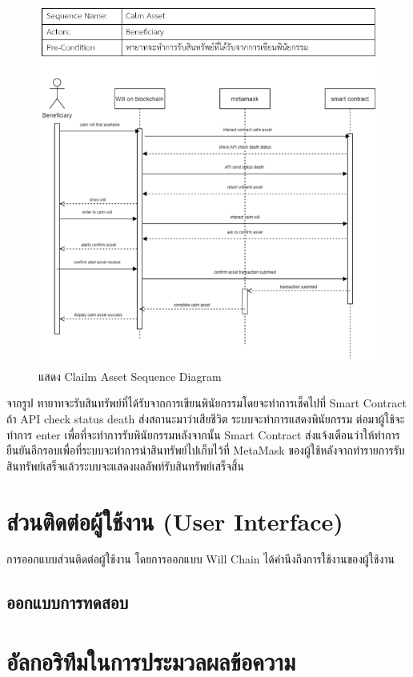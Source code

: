 \documentclass[12pt,oneside,openright,a4paper]{cpe-thai-project}
\begin{document}
\begin{enumerate}[label=\thesubsection.\arabic*,leftmargin=0pt,itemindent=2.5cm]
\begin{figure}[!thb]
			\includegraphics[scale=0.6]{calmAssetseq}
			\caption{แสดง Clailm Asset Sequence Diagram}
		\end{figure}
		\FloatBarrier
	\tab จากรูป ทายาทจะรับสินทรัพย์ที่ได้รับจากการเขียนพินัยกรรมโดยจะทำการเช็คไปที่ Smart Contract ถ้า API check status death ส่งสถานะมาว่าเสียชีวิต ระบบจะทำการแสดงพินัยกรรม ต่อมาผู้ใช้จะทำการ enter เพื่อที่จะทำการรับพินัยกรรมหลังจากนั้น Smart Contract ส่งแจ้งเตือนว่าให้ทำการยืนยันอีกรอบเพื่อที่ระบบจะทำการนำสินทรัพย์ไปเก็บไว้ที่ MetaMask ของผู้ใช้หลังจากทำรายการรับสินทรัพย์เสร็จแล้วระบบจะแสดงผลลัพท์รับสินทรัพย์เสร็จสิ้น
	\end{enumerate}
\section{ส่วนติดต่อผู้ใช้งาน (User Interface)}
\tab การออกแบบส่วนติดต่อผู้ใช้งาน โดยการออกแบบ Will Chain ได้คำนึงถึงการใช้งานของผู้ใช้งาน 
	
\subsection{ออกแบบการทดสอบ}
\section{อัลกอริทึมในการประมวลผลข้อความ}
\end{document}
